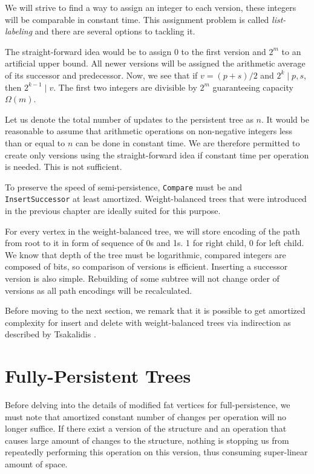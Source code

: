 We will strive to find a way to assign an integer to each version, these integers will be comparable in constant time. This assignment problem is called \emph{list-labeling} and there are several options to tackling it.

The straight-forward idea would be to assign 0 to the first version and $2^m$ to an artificial upper bound. All newer versions will be assigned the arithmetic average of its successor and predecessor. Now, we see that if $v = (p + s)/2$ and $ 2^k \mid p, s$, then $2^{k-1} \mid v$. The first two integers are divisible by $2^m$ guaranteeing capacity $\Omega(m)$. 

Let us denote the total number of updates to the persistent tree as $n$. It would be reasonable to  assume that arithmetic operations on non-negative integers less than or equal to $n$ can be done in constant time. We are therefore permitted to create only  versions using the straight-forward idea if constant time per operation is needed. This is not sufficient.

To preserve the speed of semi-persistence, \texttt{Compare} must be  and \texttt{InsertSuccessor}  at least amortized. Weight-balanced trees that were introduced in the previous chapter are ideally suited for this purpose.

For every vertex in the weight-balanced tree, we will store encoding of the path from root to it in form of sequence of 0s and 1s. 1 for right child, 0 for left child. We know that depth of the tree must be logarithmic, compared integers are composed of  bits, so comparison of versions is efficient. Inserting a successor version is also simple. Rebuilding of some subtree will not change order of versions as all path encodings will be recalculated.

Before moving to the next section, we remark that it is possible to get  amortized complexity for insert and delete with weight-balanced trees via indirection as described by Tsakalidis \cite{list-ordering}.

\section{Fully-Persistent Trees}

Before delving into the details of modified fat vertices for full-persistence, we must note that amortized constant number of changes per operation will no longer suffice. If there exist a version of the structure and an operation that causes large amount of changes to the structure, nothing is stopping us from repeatedly performing this operation on this version, thus consuming super-linear amount of space.


